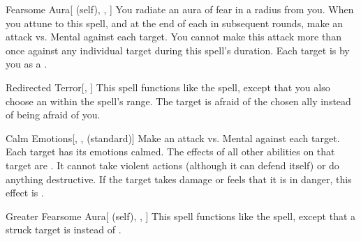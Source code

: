\lowercase{\hypertarget{spell:Fearsome Aura}{}}\label{spell:Fearsome Aura}
\begin{attuneability}[Rank 3]{\hypertarget{spell:Fearsome Aura}{Fearsome Aura}}[ (self), , ]
You radiate an aura of fear in a \areamed radius  from you.
When you attune to this spell, and at the end of each  in subsequent rounds, make an attack vs. Mental against each target.
You cannot make this attack more than once against any individual target during this spell's duration.
\hit Each target is  by you as a .
\end{attuneability}
\vspace{0.25em}



\lowercase{\hypertarget{spell:Redirected Terror}{}}\label{spell:Redirected Terror}
\begin{freeability}[Rank 3]{\hypertarget{spell:Redirected Terror}{Redirected Terror}}[, ]
This spell functions like the  spell, except that you also choose an  within the spell's range.
The target is afraid of the chosen ally instead of being afraid of you.
\end{freeability}
\vspace{0.25em}



\lowercase{\hypertarget{spell:Calm Emotions}{}}\label{spell:Calm Emotions}
\begin{freeability}[Rank 4]{\hypertarget{spell:Calm Emotions}{Calm Emotions}}[, ,  (standard)]
Make an attack vs. Mental against each target.
\hit Each target has its emotions calmed.
The effects of all other  abilities on that target are .
It cannot take violent actions (although it can defend itself) or do anything destructive.
If the target takes damage or feels that it is in danger, this effect is .
\end{freeability}
\vspace{0.25em}



\lowercase{\hypertarget{spell:Greater Fearsome Aura}{}}\label{spell:Greater Fearsome Aura}
\begin{attuneability}[Rank 5]{\hypertarget{spell:Greater Fearsome Aura}{Greater Fearsome Aura}}[ (self), , ]
This spell functions like the  spell, except that a struck target is  instead of .
\end{attuneability}
\vspace{0.25em}




